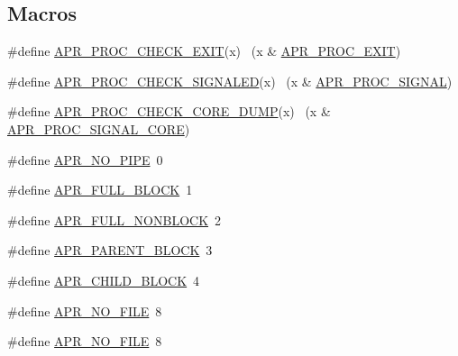 \subsection*{Macros}
\begin{DoxyCompactItemize}
\item 
\#define \hyperlink{group__apr__thread__proc_ga8f024515cc81b92d1b62d2b9388ca9d9}{A\+P\+R\+\_\+\+P\+R\+O\+C\+\_\+\+C\+H\+E\+C\+K\+\_\+\+E\+X\+IT}(x)            ~(x \& \hyperlink{group__apr__thread__proc_ggac097b4fa41e67024711c5983446d0951a977f140c82333af62aa4bed8c99a3ee2}{A\+P\+R\+\_\+\+P\+R\+O\+C\+\_\+\+E\+X\+IT})
\item 
\#define \hyperlink{group__apr__thread__proc_ga3928a31da2bae77514855ddd99cc8c38}{A\+P\+R\+\_\+\+P\+R\+O\+C\+\_\+\+C\+H\+E\+C\+K\+\_\+\+S\+I\+G\+N\+A\+L\+ED}(x)    ~(x \& \hyperlink{group__apr__thread__proc_ggac097b4fa41e67024711c5983446d0951a7e3421d18abe458ca27822d19424225b}{A\+P\+R\+\_\+\+P\+R\+O\+C\+\_\+\+S\+I\+G\+N\+AL})
\item 
\#define \hyperlink{group__apr__thread__proc_gad05006a9889e516bb73a6ac7b93f0b77}{A\+P\+R\+\_\+\+P\+R\+O\+C\+\_\+\+C\+H\+E\+C\+K\+\_\+\+C\+O\+R\+E\+\_\+\+D\+U\+MP}(x)  ~(x \& \hyperlink{group__apr__thread__proc_ggac097b4fa41e67024711c5983446d0951a6b667be4983cb59e9bed37ee05a0dcce}{A\+P\+R\+\_\+\+P\+R\+O\+C\+\_\+\+S\+I\+G\+N\+A\+L\+\_\+\+C\+O\+RE})
\item 
\#define \hyperlink{group__apr__thread__proc_gab7cfcb8ed24e6c0a76cd41b5b113ae95}{A\+P\+R\+\_\+\+N\+O\+\_\+\+P\+I\+PE}~0
\item 
\#define \hyperlink{group__apr__thread__proc_ga646af57314e71f4647243f36dd03e5ea}{A\+P\+R\+\_\+\+F\+U\+L\+L\+\_\+\+B\+L\+O\+CK}~1
\item 
\#define \hyperlink{group__apr__thread__proc_gae0707f76da785490830fc3491093767c}{A\+P\+R\+\_\+\+F\+U\+L\+L\+\_\+\+N\+O\+N\+B\+L\+O\+CK}~2
\item 
\#define \hyperlink{group__apr__thread__proc_ga8653bab028b1c2b98754babc2547f988}{A\+P\+R\+\_\+\+P\+A\+R\+E\+N\+T\+\_\+\+B\+L\+O\+CK}~3
\item 
\#define \hyperlink{group__apr__thread__proc_gacad9da4db7a22f46715e50fb8ec1c939}{A\+P\+R\+\_\+\+C\+H\+I\+L\+D\+\_\+\+B\+L\+O\+CK}~4
\item 
\#define \hyperlink{group__apr__thread__proc_ga597fb6a501c20cc3a597fe6c613f4310}{A\+P\+R\+\_\+\+N\+O\+\_\+\+F\+I\+LE}~8
\item 
\#define \hyperlink{group__apr__thread__proc_ga597fb6a501c20cc3a597fe6c613f4310}{A\+P\+R\+\_\+\+N\+O\+\_\+\+F\+I\+LE}~8

\end{DoxyCompactItemize}
